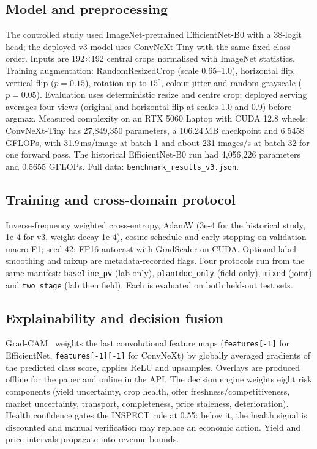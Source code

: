 \documentclass[journal,twocolumn,10pt]{IEEEtran}
\begin{document}
\subsection{Model and preprocessing}

The controlled study used ImageNet-pretrained EfficientNet-B0 with a 38-logit head; the deployed v3
model uses ConvNeXt-Tiny with the same fixed class order. Inputs are 192$\times$192 central crops
normalised with ImageNet statistics. Training augmentation: RandomResizedCrop (scale 0.65--1.0),
horizontal flip, vertical flip ($p=0.15$), rotation up to $15^\circ$, colour jitter and random
grayscale ($p=0.05$). Evaluation uses deterministic resize and centre crop; deployed serving
averages four views (original and horizontal flip at scales 1.0 and 0.9) before argmax. Measured
complexity on an RTX 5060 Laptop with CUDA 12.8 wheels: ConvNeXt-Tiny has 27{,}849{,}350 parameters,
a 106.24\,MB checkpoint and 6.5458 GFLOPs, with 31.9\,ms/image at batch 1 and about 231 images/s at
batch 32 for one forward pass. The historical EfficientNet-B0 run had 4{,}056{,}226 parameters and
0.5655 GFLOPs. Full data: \texttt{benchmark\_results\_v3.json}.

\subsection{Training and cross-domain protocol}

Inverse-frequency weighted cross-entropy, AdamW (3e-4 for the historical study, 1e-4 for v3,
weight decay 1e-4), cosine schedule and early stopping on validation macro-F1; seed 42; FP16
autocast with GradScaler on CUDA. Optional
label smoothing and mixup are metadata-recorded flags. Four protocols run from the same manifest:
\texttt{baseline\_pv} (lab only), \texttt{plantdoc\_only} (field only), \texttt{mixed} (joint) and
\texttt{two\_stage} (lab then field). Each is evaluated on both held-out test sets.

\subsection{Explainability and decision fusion}

Grad-CAM~\cite{gradcam} weights the last convolutional feature maps (\texttt{features[-1]} for
EfficientNet, \texttt{features[-1][-1]} for ConvNeXt) by globally averaged gradients
of the predicted class score, applies ReLU and upsamples. Overlays are produced offline for the
paper and online in the API. The decision engine weights eight risk components (yield uncertainty,
crop health, offer freshness/competitiveness, market uncertainty, transport, completeness, price
staleness, deterioration). Health confidence gates the INSPECT rule at 0.55: below it, the health
signal is discounted and manual verification may replace an economic action. Yield and price
intervals propagate into revenue bounds.
\end{document}
